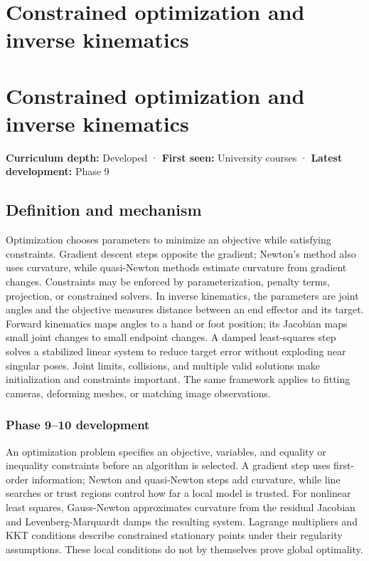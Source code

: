 \hypertarget{appendix-29f4bea4c2bb}{}
\section*{Constrained optimization and inverse kinematics}
\section{Constrained optimization and inverse kinematics}\label{appendix-29f4bea4c2bb-constrained-optimization-and-inverse-kinematics}

\textbf{Curriculum depth:} Developed · \textbf{First seen:} University courses · \textbf{Latest development:} Phase 9

\subsection{Definition and mechanism}\label{appendix-29f4bea4c2bb-definition-and-mechanism}

Optimization chooses parameters to minimize an objective while satisfying constraints. Gradient descent steps opposite the gradient; Newton's method also uses curvature, while quasi-Newton methods estimate curvature from gradient changes. Constraints may be enforced by parameterization, penalty terms, projection, or constrained solvers. In inverse kinematics, the parameters are joint angles and the objective measures distance between an end effector and its target. Forward kinematics maps angles to a hand or foot position; its Jacobian maps small joint changes to small endpoint changes. A damped least-squares step solves a stabilized linear system to reduce target error without exploding near singular poses. Joint limits, collisions, and multiple valid solutions make initialization and constraints important. The same framework applies to fitting cameras, deforming meshes, or matching image observations.

\subsubsection{Phase 9--10 development}\label{appendix-29f4bea4c2bb-phase-910-development}

An optimization problem specifies an objective, variables, and equality or inequality constraints before an algorithm is selected. A gradient step uses first-order information; Newton and quasi-Newton steps add curvature, while line searches or trust regions control how far a local model is trusted. For nonlinear least squares, Gauss-Newton approximates curvature from the residual Jacobian and Levenberg-Marquardt damps the resulting system. Lagrange multipliers and KKT conditions describe constrained stationary points under their regularity assumptions. These local conditions do not by themselves prove global optimality.


